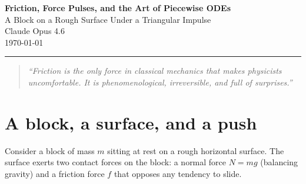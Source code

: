 \documentclass[11pt, a4paper]{article}
\begin{document}
\begin{center}
    {\LARGE\bfseries Friction, Force Pulses, and the Art of Piecewise ODEs}\\[6pt]
    {\Large\color{codegray} A Block on a Rough Surface Under a Triangular Impulse}\\[20pt]
    {\large Claude Opus 4.6}\\[4pt]
    {\color{codegray}\today}
\end{center}

\vspace{8pt}
\noindent\rule{\textwidth}{0.5pt}

\begin{abstract}
\noindent
A block of mass $m$ sits at rest on a rough horizontal surface.
A single symmetric triangular force pulse is applied, peaking above the
static friction threshold.  We derive the piecewise ODE governing
the block's motion, identifying the critical times for onset of sliding,
transition from acceleration to deceleration, and eventual re-sticking.
The system is then solved numerically using Julia's \texttt{OrdinaryDiffEq.jl}
package, producing time histories of force, velocity, and position.
The problem is an instructive example of a hybrid dynamical system ---
continuous dynamics interrupted by discrete state transitions --- where
the physics is exact and piecewise-linear, but the stick-slip friction
model demands care in numerical implementation.
\end{abstract}

\vspace{6pt}

\begin{quote}
\itshape
``Friction is the only force in classical mechanics that makes
physicists uncomfortable.  It is phenomenological, irreversible,
and full of surprises.''
\end{quote}

\vspace{4pt}

\section{A block, a surface, and a push}
\label{sec:setup}

Consider a block of mass $m$ sitting at rest on a rough horizontal surface.
The surface exerts two contact forces on the block: a normal force $N = mg$
(balancing gravity) and a friction force $f$ that opposes any tendency to slide.
\end{document}
